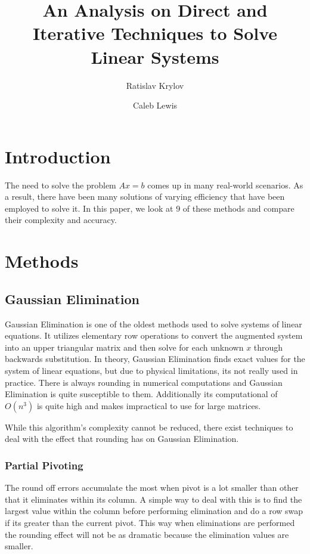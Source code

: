 \documentclass[11pt]{article}	%
\title{An Analysis on Direct and Iterative Techniques to Solve Linear Systems}
\author{Ratislav Krylov \and Caleb Lewis}
\begin{document}
\maketitle

\section{Introduction}
The need to solve the problem $Ax = b$ comes up in many real-world scenarios.
As a result, there have been many solutions of varying efficiency that
have been employed to solve it. In this paper, we look at 9 of these methods and
compare their complexity and accuracy.

\section{Methods}

\subsection{Gaussian Elimination}
Gaussian Elimination is one of the oldest methods used to solve systems of linear equations. It utilizes elementary row operations to convert the augmented system into an upper triangular matrix and then solve for each unknown $x$ through backwards substitution. In theory, Gaussian Elimination finds exact values for the system of linear equations, but due to physical limitations, its not really used in practice. There is always rounding in numerical computations and Gaussian Elimination is quite susceptible to them. Additionally its computational of $O(n^3)$ is quite high and makes impractical to use for large matrices.

While this algorithm's complexity cannot be reduced, there exist techniques to deal with the effect that rounding has on Gaussian Elimination.

    \subsubsection{Partial Pivoting}
    The round off errors accumulate the most when pivot is a lot smaller than other that it eliminates within its column. A simple way to deal with this is to find the largest value within the column before performing elimination and do a row swap if its greater than the current pivot. This way when eliminations are performed the rounding effect will not be as dramatic because the elimination values are smaller.
\end{document}
